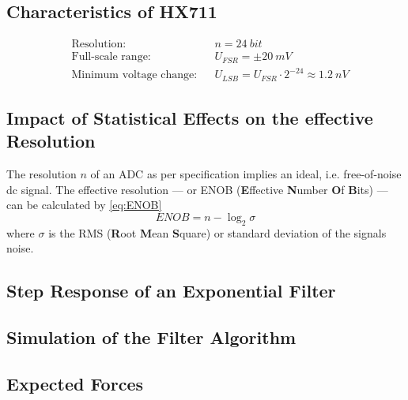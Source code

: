         \subsection{Characteristics of HX711}\label{sec:A6 characteristics of the HX711}%
            \begin{align}
                &\text{Resolution:}             &&n = \SI{24}{bit}\\
                &\text{Full-scale range:}       &&U_{FSR} = \pm \SI{20}{mV}\\
                &\text{Minimum voltage change:} &&U_{LSB} = U_{FSR} \cdot 2^{-24} \approx \SI{1.2}{nV}
            \end{align}
        \subsection{Impact of Statistical Effects on the effective Resolution}\label{sec:A7 statistical effects}%
        The resolution \( n \) of an ADC as per specification implies an ideal, i.e. free-of-noise dc signal. The effective resolution —
        or ENOB (\textbf{E}ffective \textbf{N}umber \textbf{O}f \textbf{B}its) — can be calculated by \cref{eq:ENOB}
        \begin{equation}
            ENOB = n - \log_2{\sigma}
            \label{eq:ENOB}
        \end{equation}
        where \( \sigma \) is the RMS (\textbf{R}oot \textbf{M}ean \textbf{S}quare) or standard deviation of the signals noise.
        \subsection{Step Response of an Exponential Filter}\label{sec:A8 step response expo filter}%
        \subsection{Simulation of the Filter Algorithm}\label{sec:A9 simu of the filter algo}%
        \subsection{Expected Forces}\label{sec:A10 expected forces}%
